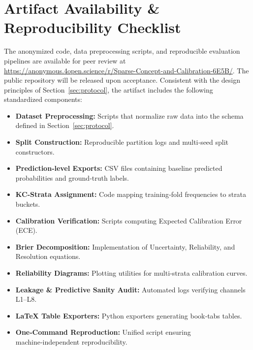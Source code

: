 \documentclass[12pt,a4paper]{jedm}
\begin{document}







\section*{Artifact Availability \& Reproducibility Checklist}
\begin{sloppypar}
The anonymized code, data preprocessing scripts, and reproducible evaluation pipelines are available for peer review at \url{https://anonymous.4open.science/r/Sparse-Concept-and-Calibration-6E5B/}. The public repository will be released upon acceptance. Consistent with the design principles of Section~\ref{sec:protocol}, the artifact includes the following standardized components:
\end{sloppypar}
\begin{itemize}
  \item \textbf{Dataset Preprocessing:} Scripts that normalize raw data into the schema defined in Section~\ref{sec:protocol}.
  \item \textbf{Split Construction:} Reproducible partition logs and multi‑seed split constructors.
  \item \textbf{Prediction‑level Exports:} CSV files containing baseline predicted probabilities and ground‑truth labels.
  \item \textbf{KC‑Strata Assignment:} Code mapping training‑fold frequencies to strata buckets.
  \item \textbf{Calibration Verification:} Scripts computing Expected Calibration Error (ECE).
  \item \textbf{Brier Decomposition:} Implementation of Uncertainty, Reliability, and Resolution equations.
  \item \textbf{Reliability Diagrams:} Plotting utilities for multi‑strata calibration curves.
  \item \textbf{Leakage \& Predictive Sanity Audit:} Automated logs verifying channels L1--L8.
  \item \textbf{LaTeX Table Exporters:} Python exporters generating book‑tabs tables.
  \item \textbf{One‑Command Reproduction:} Unified script ensuring machine‑independent reproducibility.
\end{itemize}

\appendix

\end{document}
